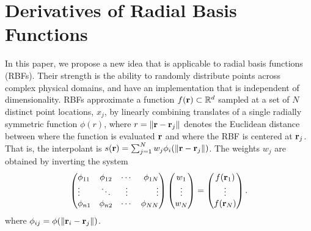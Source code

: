 \documentclass[10pt,conference,compsocconf]{IEEEtran}
\begin{document}
\section{Derivatives of Radial Basis Functions}
\label{sec:rbf}

In this paper, we propose a new idea that is applicable to radial
basis functions (RBFs). Their strength is the ability to randomly
distribute points across complex physical domains, and have an
implementation that is independent of dimensionality. RBFs approximate
a function $f({\bf r})\subset \mathbb{R}^d$ sampled at a set of $N$
distinct point locations, $x_j$, by linearly combining translates of a
single radially symmetric function $\phi(r)$, where $r =
\|{\bf r}-{\bf r}_{j}\|$ denotes the Euclidean distance %
between where the function is evaluated
${\bf r}$ and where the RBF is centered at ${\bf r}_{j}$. That is, the
interpolant is $s({\bf r}) = \sum_{j=1}^{N} w_j
\phi_i(\|{\bf r}-{\bf r}_{j}\|)$. The weights $w_j$ are obtained by
inverting the system
\begin{equation}
\parray{lccr}{
\phi_{11} & \phi_{12} & \cdots & \phi_{1N} \\
\vdots & \ddots & \vdots & \vdots \\
\phi_{n1} & \phi_{n2} & \cdots & \phi_{NN} 
}
\parray{c}{ w_{1} \\ \vdots \\ w_{N} }
=
\parray{c}{ f(\rvec_1) \\ \vdots\\ f(\rvec_N) }. 
\label{eq:rbf}
\end{equation}
where $\phi_{ij} = \phi(\|{\bf r}_i-{\bf r}_j\|)$. 
\end{document}
